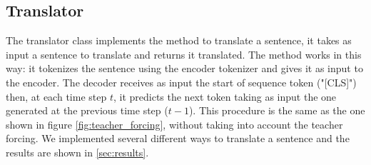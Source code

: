 \subsection{Translator}\label{subsec:translator}
The translator class implements the method to translate a sentence, it takes as input a sentence to translate and returns it translated. The method works in this way: it tokenizes the sentence using the encoder tokenizer and gives it as input to the encoder. The decoder receives as input the start of sequence token ("[CLS]") then, at each time step $t$, it predicts the next token taking as input the one generated at the previous time step ($t-1$). This procedure is the same as the one shown in figure \ref{fig:teacher_forcing}, without taking into account the teacher forcing. We implemented several different ways to translate a sentence and the results are shown in \autoref{sec:results}.

